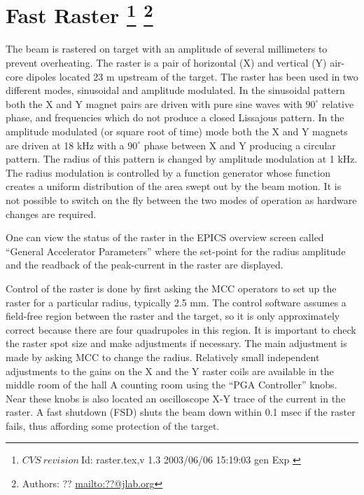 \section[Fast Raster]{Fast Raster
\footnote{
  $CVS~revision~ $Id: raster.tex,v 1.3 2003/06/06 15:19:03 gen Exp $ $
}
\footnote{Authors: ?? \url{mailto:??@jlab.org}}
}

The beam is rastered on target with an amplitude of
several millimeters to prevent overheating.  
The raster is a pair of horizontal (X) and vertical (Y)
air-core dipoles located 23 m upstream of the
target. The raster has been used in two different modes,
sinusoidal and amplitude modulated. In the sinusoidal pattern
both the X and Y magnet pairs are driven with pure sine waves
with $90^{\circ}$ relative phase, 
and frequencies which do not produce a closed Lissajous pattern.
In the amplitude modulated (or square root of time) mode  
both the X and Y magnets are driven at 18 kHz with
a $90^{\circ}$ phase between X and Y producing  a circular
pattern. The radius of this pattern is changed by amplitude
modulation at 1 kHz. The radius modulation
is controlled by a function generator whose function
creates a uniform distribution of the area swept out
by the beam motion. It is not possible to switch on the fly
between the two modes of operation as hardware changes are required.

One can view the status of the raster in the
EPICS overview screen called ``General Accelerator
Parameters'' where the set-point for the radius amplitude
and the readback of the peak-current in the raster are displayed.

Control of the raster is done by first asking the MCC
operators to set up the raster for a particular radius, 
typically 2.5 mm.
The control software assumes a field-free region between
the raster and the target, so it is only approximately
correct because there are four quadrupoles in this region.
It is important to check the raster spot size and
make adjustments if necessary.  The main adjustment is made
by asking MCC to change the radius.
Relatively small independent adjustments to the 
gains on the X and the Y raster
coils are available in the middle room of the hall A
counting room using the ``PGA Controller'' knobs.
Near these knobs is also located an oscilloscope X-Y trace
of the current in the raster.  A fast shutdown (FSD) shuts
the beam down within 0.1 msec if the raster fails, thus
affording some protection of the target.

